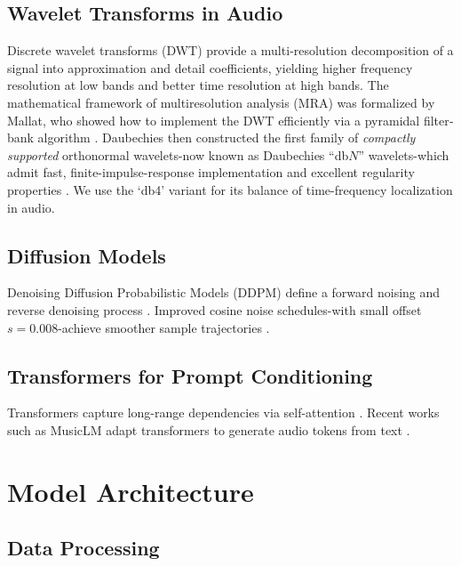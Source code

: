 \documentclass[12pt]{report}
\begin{document}
\section{Wavelet Transforms in Audio}
Discrete wavelet transforms (DWT) provide a multi‐resolution decomposition of a signal into approximation and detail coefficients, yielding higher frequency resolution at low bands and better time resolution at high bands.  The mathematical framework of multiresolution analysis (MRA) was formalized by Mallat, who showed how to implement the DWT efficiently via a pyramidal filter‐bank algorithm \cite{Mallat1989}.  Daubechies then constructed the first family of \emph{compactly supported} orthonormal wavelets-now known as Daubechies “db$N$” wavelets-which admit fast, finite-impulse-response implementation and excellent regularity properties \cite{Daubechies1988}.  We use the ‘db4’ variant for its balance of time-frequency localization in audio.
\section{Diffusion Models}
Denoising Diffusion Probabilistic Models (DDPM) define a forward noising and reverse denoising process \cite{Ho2020}. Improved cosine noise schedules-with small offset $s=0.008$-achieve smoother sample trajectories \cite{NicholDhariwal2021}.

\section{Transformers for Prompt Conditioning}
Transformers capture long-range dependencies via self-attention \cite{Vaswani2017}. Recent works such as MusicLM adapt transformers to generate audio tokens from text \cite{Agostinelli2023}.

\chapter{Model Architecture}

\section{Data Processing}
\end{document}
